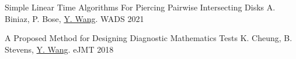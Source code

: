 
\begin{cvhonors}

\cvhonor
{Simple Linear Time Algorithms For Piercing Pairwise Intersecting Disks}
{A. Biniaz, P. Bose, \underline{Y. Wang}.}
{WADS}
{2021}

\cvhonor
{A Proposed Method for Designing Diagnostic Mathematics Tests}
{K. Cheung, B. Stevens, \underline{Y. Wang}.}
{eJMT}
{2018}

\end{cvhonors}


%
%
%
%
